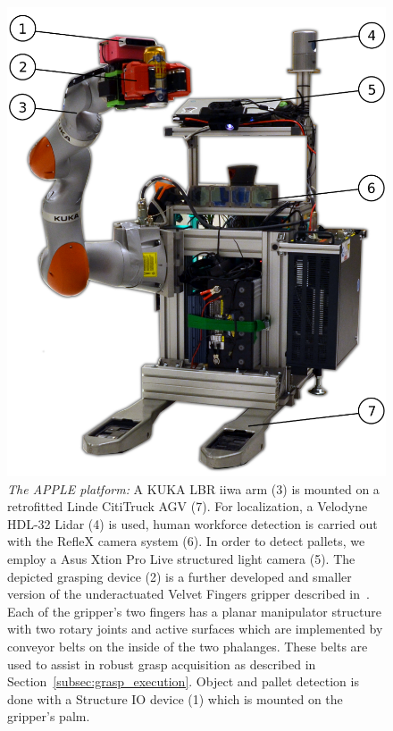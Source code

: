 \begin{figure}[t!]
\begin{center}
\includegraphics[width =0.85\linewidth]{figs/apple_demonstrator}
\caption{\textit{The APPLE platform:} A KUKA LBR iiwa arm (3) is mounted on a retrofitted Linde
  CitiTruck AGV (7). For localization, a Velodyne HDL-32 Lidar (4) is used, human workforce detection
  is carried out with the RefleX camera system (6). In order to detect pallets, we employ a Asus
  Xtion Pro Live structured light camera (5). The depicted grasping device (2) is a further
  developed and smaller version of the underactuated Velvet Fingers gripper described
  in~\cite{Tinc12}. Each of the gripper’s two fingers has a planar manipulator structure with two
  rotary joints and active surfaces which are implemented by conveyor belts on the inside of the two
  phalanges. These belts are used to assist in robust grasp acquisition as described in
  Section~\ref{subsec:grasp_execution}. Object and pallet detection is done with a Structure IO
  device (1) which is mounted on the gripper's palm.}
\label{fig:robot}
\vspace{-0.5cm}
\end{center}
\end{figure}

